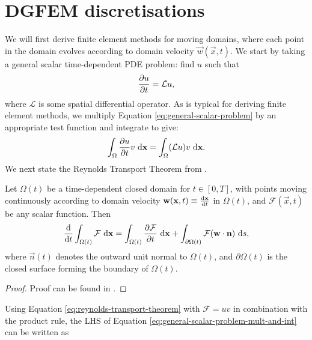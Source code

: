     \section{DGFEM discretisations} \label{sec:contractions:dgfem-discretisation}    
        We will first derive finite element methods for moving domains, where each point in the domain evolves according to domain velocity $\vec{w}(\vec{x}, t)$. We start by taking a general scalar time-dependent PDE problem: find $u$ such that
        \begin{equation}
            \pdv{u}{t} = \mathcal{L} u,
            \label{eq:general-scalar-problem}
        \end{equation}
        where $\mathcal{L}$ is some spatial differential operator. As is typical for deriving finite element methods, we multiply Equation \eqref{eq:general-scalar-problem} by an appropriate test function and integrate to give:
        \begin{equation}
            \int_\Omega \pdv{u}{t} v ~\mathrm{d} \boldsymbol{\mathbf{x}} = \int_\Omega (\mathcal{L} u) v ~\mathrm{d} \boldsymbol{\mathbf{x}}.
            \label{eq:general-scalar-problem-mult-and-int}
        \end{equation}
        We next state the Reynolds Transport Theorem from \citeauthor{arisVectorsTensorsBasic1989} \cite{arisVectorsTensorsBasic1989}.
        \begin{theorem}
            Let $\Omega(t)$ be a time-dependent closed domain for $t \in [0, T]$, with points moving continuously according to domain velocity $\boldsymbol{\mathbf{w}}(\boldsymbol{\mathbf{x}}, t) \equiv \dv{\boldsymbol{\mathbf{x}}}{t}$ in $\Omega(t)$, and $\mathcal{F}(\vec{x}, t)$ be any scalar function. Then
            \begin{equation}
                \dv{}{t} \int_{\Omega(t)} \mathcal{F} ~\mathrm{d}\boldsymbol{\mathbf{x}} = \int_{\Omega(t)} \pdv{\mathcal{F}}{t} ~\mathrm{d}\boldsymbol{\mathbf{x}} + \int_{\partial\Omega(t)} \mathcal{F} (\boldsymbol{\mathbf{w}} \cdot \boldsymbol{\mathbf{n}}) ~\mathrm{d} s,
                \label{eq:reynolds-transport-theorem}    
            \end{equation}
            where $\vec{n}(t)$ denotes the outward unit normal to $\Omega(t)$, and $\partial\Omega(t)$ is the closed surface forming the boundary of $\Omega(t)$.
        \end{theorem}
        \begin{proof}
            Proof can be found in \citeauthor{arisVectorsTensorsBasic1989} \cite{arisVectorsTensorsBasic1989}.
        \end{proof}\noindent
        Using Equation \eqref{eq:reynolds-transport-theorem} with $\mathcal{F} = uv$ in combination with the product rule, the LHS of Equation \eqref{eq:general-scalar-problem-mult-and-int} can be written as
